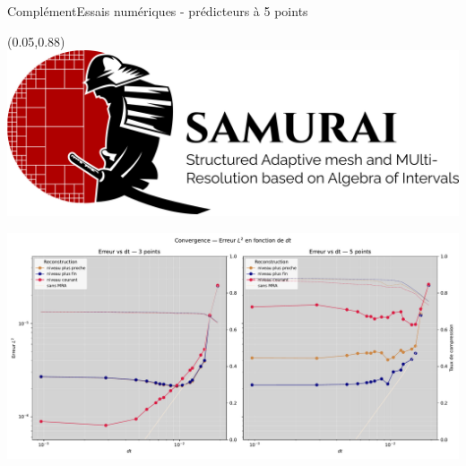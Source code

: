 \begin{frame}{Complément}{Essais numériques - prédicteurs à 5 points}
    \begin{textblock*}{40pt}(0.05\paperwidth,0.88\paperheight)\includegraphics[scale=.03]{medias/2_/1_/light_logo.png}\end{textblock*}
    \includegraphics[width = \textwidth]{medias/3_/error_vs_dt_by_mlf.pdf}
\end{frame}